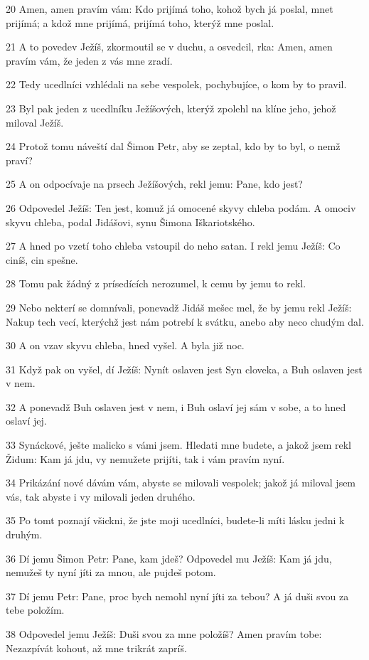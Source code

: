 \par 20 Amen, amen pravím vám: Kdo prijímá toho, kohož bych já poslal, mnet prijímá; a kdož mne prijímá, prijímá toho, kterýž mne poslal.
\par 21 A to povedev Ježíš, zkormoutil se v duchu, a osvedcil, rka: Amen, amen pravím vám, že jeden z vás mne zradí.
\par 22 Tedy ucedlníci vzhlédali na sebe vespolek, pochybujíce, o kom by to pravil.
\par 23 Byl pak jeden z ucedlníku Ježíšových, kterýž zpolehl na klíne jeho, jehož miloval Ježíš.
\par 24 Protož tomu náveští dal Šimon Petr, aby se zeptal, kdo by to byl, o nemž praví?
\par 25 A on odpocívaje na prsech Ježíšových, rekl jemu: Pane, kdo jest?
\par 26 Odpovedel Ježíš: Ten jest, komuž já omocené skyvy chleba podám. A omociv skyvu chleba, podal Jidášovi, synu Šimona Iškariotského.
\par 27 A hned po vzetí toho chleba vstoupil do neho satan. I rekl jemu Ježíš: Co ciníš, cin spešne.
\par 28 Tomu pak žádný z prísedících nerozumel, k cemu by jemu to rekl.
\par 29 Nebo nekterí se domnívali, ponevadž Jidáš mešec mel, že by jemu rekl Ježíš: Nakup tech vecí, kterýchž jest nám potrebí k svátku, anebo aby neco chudým dal.
\par 30 A on vzav skyvu chleba, hned vyšel. A byla již noc.
\par 31 Když pak on vyšel, dí Ježíš: Nynít oslaven jest Syn cloveka, a Buh oslaven jest v nem.
\par 32 A ponevadž Buh oslaven jest v nem, i Buh oslaví jej sám v sobe, a to hned oslaví jej.
\par 33 Synáckové, ješte malicko s vámi jsem. Hledati mne budete, a jakož jsem rekl Židum: Kam já jdu, vy nemužete prijíti, tak i vám pravím nyní.
\par 34 Prikázání nové dávám vám, abyste se milovali vespolek; jakož já miloval jsem vás, tak abyste i vy milovali jeden druhého.
\par 35 Po tomt poznají všickni, že jste moji ucedlníci, budete-li míti lásku jedni k druhým.
\par 36 Dí jemu Šimon Petr: Pane, kam jdeš? Odpovedel mu Ježíš: Kam já jdu, nemužeš ty nyní jíti za mnou, ale pujdeš potom.
\par 37 Dí jemu Petr: Pane, proc bych nemohl nyní jíti za tebou? A já duši svou za tebe položím.
\par 38 Odpovedel jemu Ježíš: Duši svou za mne položíš? Amen pravím tobe: Nezazpívát kohout, až mne trikrát zapríš.

